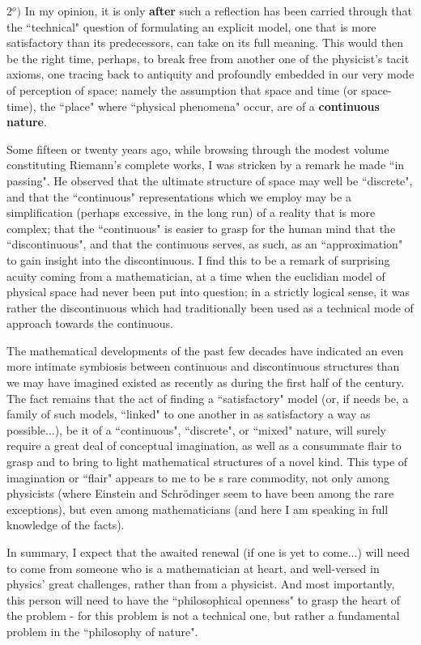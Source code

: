 {2$^o)$ In my opinion, it is only \textbf{after} such a reflection has been carried through that the ``technical" question of formulating an explicit model, one that is more satisfactory than its predecessors, can take on its full meaning. This would then be the right time, perhaps, to break free from another one of the physicist's tacit axioms, one tracing back to antiquity and profoundly embedded in our very mode of perception of space: namely the assumption that space and time (or space-time), the ``place" where ``physical phenomena" occur, are of a \textbf{continuous nature}.

Some fifteen or twenty years ago, while browsing through the modest volume constituting Riemann's complete works, I was stricken by a remark he made ``in passing". He observed that the ultimate structure of space may well be ``discrete", and that the ``continuous" representations which we employ may be a simplification (perhaps excessive, in the long run) of a reality that is more complex; that the ``continuous" is easier to grasp for the human mind that the ``discontinuous", and that the continuous serves, as such, as an ``approximation" to gain insight into the discontinuous. I find this to be a remark of surprising acuity coming from a mathematician, at a time when the euclidian model of physical space had never been put into question; in a strictly logical sense, it was rather the discontinuous which had traditionally been used as a technical mode of approach towards the continuous.

The mathematical developments of the past few decades have indicated an even more intimate symbiosis between continuous and discontinuous structures than we may have imagined existed as recently as during the first half of the century. The fact remains that the act of finding a ``satisfactory" model (or, if needs be, a family of such models, ``linked" to one another in as satisfactory a way as possible...), be it of a ``continuous", ``discrete", or ``mixed" nature, will surely require a great deal of conceptual imagination, as well as a consummate flair to grasp and to bring to light mathematical structures of a novel kind. This type of imagination or ``flair" appears to me to be s rare commodity, not only among physicists (where Einstein and Schr\"odinger seem to have been among the rare exceptions), but even among mathematicians (and here I am speaking in full knowledge of the facts).

In summary, I expect that the awaited renewal (if one is yet to come...) will need to come from someone who is a mathematician at heart, and well-versed in physics' great challenges, rather than from a physicist. And most importantly, this person will need to have the ``philosophical openness" to grasp the heart of the problem - for this problem is not a technical one, but rather a fundamental problem in the ``philosophy of nature".}

